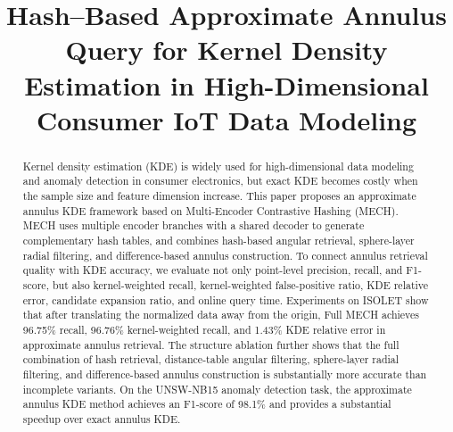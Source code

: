 \documentclass[conference]{IEEEtran}
\begin{document}
\title{Hash–Based Approximate Annulus Query for  Kernel Density Estimation in High-Dimensional Consumer IoT Data Modeling
}

\author{
\and
{}

}

\maketitle

\begin{abstract}
Kernel density estimation (KDE) is widely used for high-dimensional data modeling and anomaly detection in consumer electronics, but exact KDE becomes costly when the sample size and feature dimension increase. This paper proposes an approximate annulus KDE framework based on Multi-Encoder Contrastive Hashing (MECH). MECH uses multiple encoder branches with a shared decoder to generate complementary hash tables, and combines hash-based angular retrieval, sphere-layer radial filtering, and difference-based annulus construction. To connect annulus retrieval quality with KDE accuracy, we evaluate not only point-level precision, recall, and F1-score, but also kernel-weighted recall, kernel-weighted false-positive ratio, KDE relative error, candidate expansion ratio, and online query time. Experiments on ISOLET show that after translating the normalized data away from the origin, Full MECH achieves 96.75\% recall, 96.76\% kernel-weighted recall, and 1.43\% KDE relative error in approximate annulus retrieval. The structure ablation further shows that the full combination of hash retrieval, distance-table angular filtering, sphere-layer radial filtering, and difference-based annulus construction is substantially more accurate than incomplete variants. On the UNSW-NB15 anomaly detection task, the approximate annulus KDE method achieves an F1-score of 98.1\% and provides a substantial speedup over exact annulus KDE.
\end{abstract}
\end{document}

